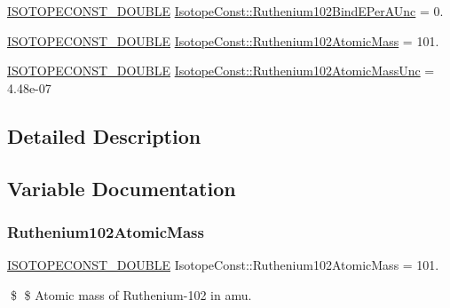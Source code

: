 \begin{DoxyCompactItemize}
\mbox{\hyperlink{group___isotope_const-_macros_ga8f45a7272ce02c0b4c65c44636ed719a}{I\+S\+O\+T\+O\+P\+E\+C\+O\+N\+S\+T\+\_\+\+D\+O\+U\+B\+LE}} \mbox{\hyperlink{group___isotope_const-_ruthenium-_ru102_ga473ac4585420dfdffdff6a26adbc80d2}{Isotope\+Const\+::\+Ruthenium102\+Bind\+E\+Per\+A\+Unc}} = 0.
\item 
\mbox{\hyperlink{group___isotope_const-_macros_ga8f45a7272ce02c0b4c65c44636ed719a}{I\+S\+O\+T\+O\+P\+E\+C\+O\+N\+S\+T\+\_\+\+D\+O\+U\+B\+LE}} \mbox{\hyperlink{group___isotope_const-_ruthenium-_ru102_ga921685bfd3fd2ea868569678850737f6}{Isotope\+Const\+::\+Ruthenium102\+Atomic\+Mass}} = 101.
\item 
\mbox{\hyperlink{group___isotope_const-_macros_ga8f45a7272ce02c0b4c65c44636ed719a}{I\+S\+O\+T\+O\+P\+E\+C\+O\+N\+S\+T\+\_\+\+D\+O\+U\+B\+LE}} \mbox{\hyperlink{group___isotope_const-_ruthenium-_ru102_ga3c9014eb61cedfde8de7d0707231a13f}{Isotope\+Const\+::\+Ruthenium102\+Atomic\+Mass\+Unc}} = 4.\+48e-\/07
\end{DoxyCompactItemize}


\subsection{Detailed Description}


\subsection{Variable Documentation}
\mbox{\label{group___isotope_const-_ruthenium-_ru102_ga921685bfd3fd2ea868569678850737f6}} 
\subsubsection{\texorpdfstring{Ruthenium102\+Atomic\+Mass}{Ruthenium102AtomicMass}}
{\footnotesize\ttfamily \mbox{\hyperlink{group___isotope_const-_macros_ga8f45a7272ce02c0b4c65c44636ed719a}{I\+S\+O\+T\+O\+P\+E\+C\+O\+N\+S\+T\+\_\+\+D\+O\+U\+B\+LE}} Isotope\+Const\+::\+Ruthenium102\+Atomic\+Mass = 101.}

\$ \$ Atomic mass of Ruthenium-\/102 in amu. \mbox{\label{group___isotope_const-_ruthenium-_ru102_ga3c9014eb61cedfde8de7d0707231a13f}} 
